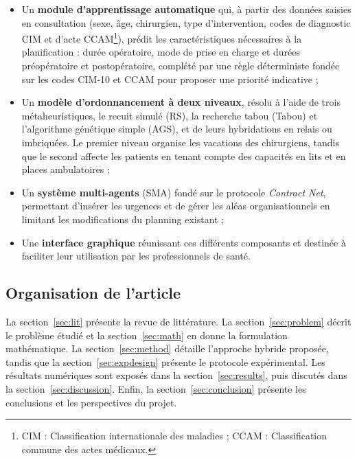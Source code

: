 \documentclass[11pt,a4paper]{article}
\begin{document}
\begin{itemize}
    \item Un \textbf{module d'apprentissage automatique} qui, à partir des données saisies en consultation (sexe, âge, chirurgien, type d'intervention, codes de diagnostic CIM et d'acte CCAM\footnote{CIM : Classification internationale des maladies ; CCAM : Classification commune des actes médicaux.}), prédit les caractéristiques nécessaires à la planification : durée opératoire, mode de prise en charge et durées préopératoire et postopératoire, complété par une règle déterministe fondée sur les codes CIM-10 et CCAM pour proposer une priorité indicative ;

    \item Un \textbf{modèle d'ordonnancement à deux niveaux}, résolu à l'aide de trois métaheuristiques, le recuit simulé (RS), la recherche tabou (Tabou) et l'algorithme génétique simple (AGS), et de leurs hybridations en relais ou imbriquées. Le premier niveau organise les vacations des chirurgiens, tandis que le second affecte les patients en tenant compte des capacités en lits et en places ambulatoires ;

    \item Un \textbf{système multi-agents} (SMA) fondé sur le protocole \emph{Contract Net}, permettant d'insérer les urgences et de gérer les aléas organisationnels en limitant les modifications du planning existant ;

    \item Une \textbf{interface graphique} réunissant ces différents composants et destinée à faciliter leur utilisation par les professionnels de santé.
\end{itemize}

\subsection{Organisation de l'article}

La section~\ref{sec:lit} présente la revue de littérature. La section~\ref{sec:problem} décrit le problème étudié et la section~\ref{sec:math} en donne la formulation mathématique. La section~\ref{sec:method} détaille l'approche hybride proposée, tandis que la section~\ref{sec:expdesign} présente le protocole expérimental. Les résultats numériques sont exposés dans la section~\ref{sec:results}, puis discutés dans la section~\ref{sec:discussion}. Enfin, la section~\ref{sec:conclusion} présente les conclusions et les perspectives du projet.
\end{document}
